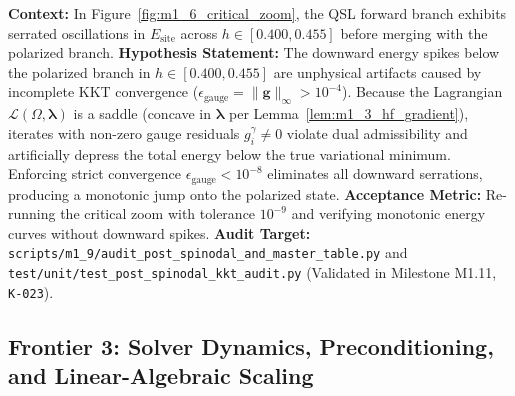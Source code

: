 \begin{contract}
\label{con:h7_kkt_saddle_excursions}
\textbf{Context:} In Figure~\ref{fig:m1_6_critical_zoom}, the QSL forward branch exhibits serrated oscillations in $E_{\mathrm{site}}$ across $h \in [0.400, 0.455]$ before merging with the polarized branch.
\textbf{Hypothesis Statement:} The downward energy spikes below the polarized branch in $h \in [0.400, 0.455]$ are unphysical artifacts caused by incomplete KKT convergence ($\epsilon_{\mathrm{gauge}} = \|\mathbf{g}\|_\infty > 10^{-4}$). Because the Lagrangian $\mathcal{L}(\Omega, \boldsymbol{\lambda})$ is a saddle (concave in $\boldsymbol{\lambda}$ per Lemma~\ref{lem:m1_3_hf_gradient}), iterates with non-zero gauge residuals $g_i^\gamma \neq 0$ violate dual admissibility and artificially depress the total energy below the true variational minimum. Enforcing strict convergence $\epsilon_{\mathrm{gauge}} < 10^{-8}$ eliminates all downward serrations, producing a monotonic jump onto the polarized state.
\textbf{Acceptance Metric:} Re-running the critical zoom with tolerance $10^{-9}$ and verifying monotonic energy curves without downward spikes.
\textbf{Audit Target:} \texttt{scripts/m1\_9/audit\_post\_spinodal\_and\_master\_table.py} and \texttt{test/unit/test\_post\_spinodal\_kkt\_audit.py} (Validated in Milestone M1.11, \texttt{K-023}).
\end{contract}

\subsection{Frontier 3: Solver Dynamics, Preconditioning, and Linear-Algebraic Scaling}


